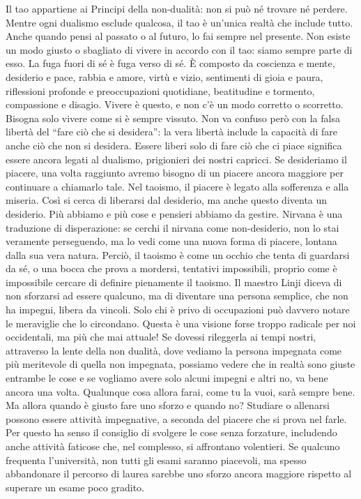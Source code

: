 \documentclass[12pt]{book} %
\begin{document}
Il tao appartiene ai Principi della non-dualità: non si può né trovare né perdere. Mentre ogni dualismo esclude qualcosa, il tao è un'unica realtà che include tutto. Anche quando pensi al passato o al futuro, lo fai sempre nel presente. Non esiste un modo giusto o sbagliato di vivere in accordo con il tao: siamo sempre parte di esso. La fuga fuori di sé è fuga verso di sé.
È composto da coscienza e mente, desiderio e pace, rabbia e amore, virtù e vizio, sentimenti di gioia e paura, riflessioni profonde e preoccupazioni quotidiane, beatitudine e tormento, compassione e disagio. Vivere è questo, e non c’è un modo corretto o scorretto. Bisogna solo vivere come si è sempre vissuto.
Non va confuso però con la falsa libertà del “fare ciò che si desidera”: la vera libertà include la capacità di fare anche ciò che non si desidera. Essere liberi solo di fare ciò che ci piace significa essere ancora legati al dualismo, prigionieri dei nostri capricci.
Se desideriamo il piacere, una volta raggiunto avremo bisogno di un piacere ancora maggiore per continuare a chiamarlo tale. Nel taoismo, il piacere è legato alla sofferenza e alla miseria. Così si cerca di liberarsi dal desiderio, ma anche questo diventa un desiderio. Più abbiamo e più cose e pensieri abbiamo da gestire.
Nirvana è una traduzione di disperazione: se cerchi il nirvana come non-desiderio, non lo stai veramente perseguendo, ma lo vedi come una nuova forma di piacere, lontana dalla sua vera natura. Perciò, il taoismo è come un occhio che tenta di guardarsi da sé, o una bocca che prova a mordersi, tentativi impossibili, proprio come è impossibile cercare di definire pienamente il taoismo.
Il maestro Linji diceva di non sforzarsi ad essere qualcuno, ma di diventare una persona semplice, che non ha impegni, libera da vincoli. Solo chi è privo di occupazioni può davvero notare le meraviglie che lo circondano. Questa è una visione forse troppo radicale per noi occidentali, ma più che mai attuale! Se dovessi rileggerla ai tempi nostri, attraverso la lente della non dualità, dove vediamo la persona impegnata come più meritevole di quella non impegnata, possiamo vedere che in realtà sono giuste entrambe le cose e se vogliamo avere solo alcuni impegni e altri no, va bene ancora una volta.
Qualunque cosa allora farai, come tu la vuoi, sarà sempre bene.
Ma allora quando è giusto fare uno sforzo e quando no? Studiare o allenarsi possono essere attività impegnative, a seconda del piacere che si prova nel farle. Per questo ha senso il consiglio di svolgere le cose senza forzature, includendo anche attività faticose che, nel complesso, si affrontano volentieri. Se qualcuno frequenta l'università, non tutti gli esami saranno piacevoli, ma spesso abbandonare il percorso di laurea sarebbe uno sforzo ancora maggiore rispetto al superare un esame poco gradito.
\end{document}
